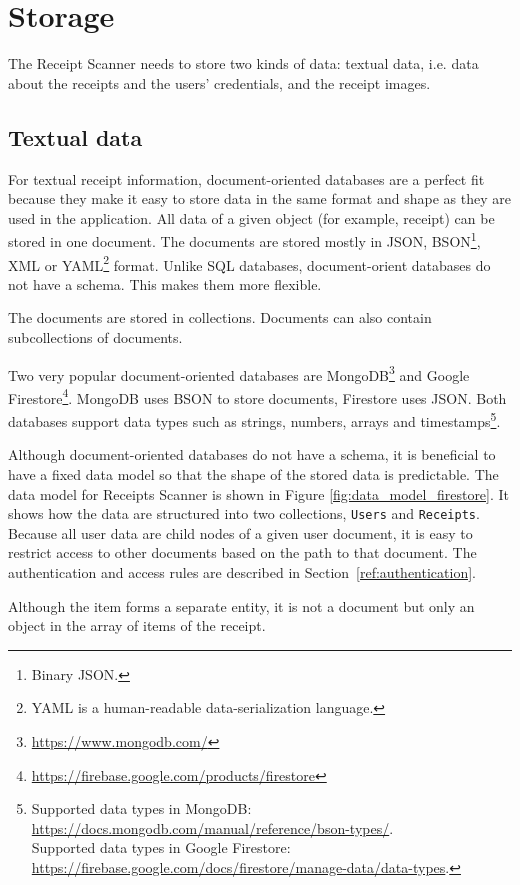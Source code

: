 \documentclass[
  printed, %
  table,   %
  oneside, %
  lof,     %
  lot,     %
]{fithesis3}
\newcommand{\definition}[1]{{#1}}
\begin{document}
\section{Storage}
\label{sec:storage}
The Receipt Scanner needs to store two kinds of data: textual data, i.e. data about the receipts and the users' credentials, and the receipt images.

\subsection{Textual data}
For textual receipt information, document-oriented databases are a perfect fit because they make it easy to store data in the same format and shape as they are used in the application. 
All data of a given object (for example, receipt) can be stored in one document. The documents are stored mostly in JSON, BSON\footnote{Binary JSON.}, XML or YAML\footnote{\definition{YAML} is a human-readable data-serialization language.} format. Unlike SQL databases, document-orient databases do not have a schema. This makes them more flexible.

The documents are stored in collections. Documents can also contain subcollections of documents.

Two very popular document-oriented databases are MongoDB\footnote{\url{https://www.mongodb.com/}} and Google Firestore\footnote{\url{https://firebase.google.com/products/firestore}}. MongoDB uses BSON to store documents, Firestore uses JSON. Both databases support data types such as strings, numbers, arrays and timestamps\footnote{Supported data types in MongoDB: \url{https://docs.mongodb.com/manual/reference/bson-types/}.\\Supported data types in Google Firestore: \url{https://firebase.google.com/docs/firestore/manage-data/data-types}.}.

Although document-oriented databases do not have a schema, it is beneficial to have a fixed data model so that the shape of the stored data is predictable.
The data model for Receipts Scanner is shown in Figure \ref{fig:data_model_firestore}. It shows how the data are structured into two collections, \texttt{Users} and \texttt{Receipts}. Because all user data are child nodes of a given user document, it is easy to restrict access to other documents based on the path to that document. The authentication and access rules are described in Section~\ref{ref:authentication}.

Although the item forms a separate entity, it is not a document but only an object in the array of items of the receipt.
\end{document}
